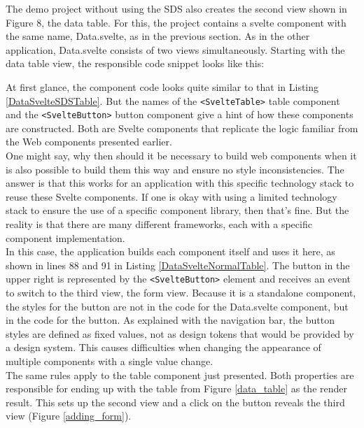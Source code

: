The demo project without using the SDS also creates the second view shown in Figure 8, the data table. For this, the project contains a svelte component with the same name, Data.svelte, as in the previous section. As in the other application, Data.svelte consists of two views simultaneously. 
Starting with the data table view, the responsible code snippet looks like this:

At first glance, the component code looks quite similar to that in Listing \ref{DataSvelteSDSTable}. But the names of the \texttt{<SvelteTable>} table component and the \texttt{<SvelteButton>} button component give a hint of how these components are constructed. Both are Svelte components that replicate the logic familiar from the Web components presented earlier. \\
One might say, why then should it be necessary to build web components when it is also possible to build them this way and ensure no style inconsistencies. The answer is that this works for an application with this specific technology stack to reuse these Svelte components. If one is okay with using a limited technology stack to ensure the use of a specific component library, then that's fine. But the reality is that there are many different frameworks, each with a specific component implementation.\\
In this case, the application builds each component itself and uses it here, as shown in lines 88 and 91 in Listing \ref{DataSvelteNormalTable}. 
The button in the upper right is represented by the \texttt{<SvelteButton>} element and receives an event to switch to the third view, the form view. Because it is a standalone component, the styles for the button are not in the code for the Data.svelte component, but in the code for the button. As explained with the navigation bar, the button styles are defined as fixed values, not as design tokens that would be provided by a design system. This causes difficulties when changing the appearance of multiple components with a single value change. \\
The same rules apply to the table component just presented. Both properties are responsible for ending up with the table from Figure \ref{data_table} as the render result. This sets up the second view and a click on the button reveals the third view (Figure \ref{adding_form}). \\

